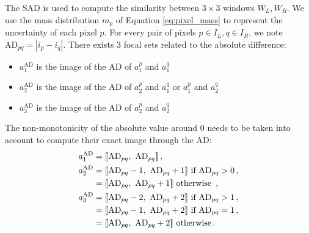 The SAD is used to compute the similarity between $3\times3$ windows $W_L, W_R$. We use the mass distribution $m_p$ of Equation \eqref{eq:pixel_mass} to represent the uncertainty of each pixel $p$. For every pair of pixels $p\in I_L, q\in I_R$, we note $\mathrm{AD}_{pq}=|i_p - i_q|$. There exists $3$ focal sets related to the absolute difference:
\begin{itemize}
    \item $a^{\mathrm{AD}}_1$ is the image of the AD of $a^p_1$ and $a^q_1$
    \item $a^{\mathrm{AD}}_2$ is the image of the AD of $a^p_2$ and $a^q_1$ or $a^p_1$ and $a^q_2$
    \item  $a^{\mathrm{AD}}_3$ is the image of the AD of $a^p_2$ and $a^q_2$
\end{itemize}
The non-monotonicity of the absolute value around $0$ needs to be taken into account to compute their exact image through the AD:
\begin{align*}
    a^{\mathrm{AD}}_1&=\opi\mathrm{AD}_{pq},~\mathrm{AD}_{pq}\cli\,,\\
    a^{\mathrm{AD}}_2&=\opi\mathrm{AD}_{pq} - 1,~\mathrm{AD}_{pq} + 1\cli\text{ if }\mathrm{AD}_{pq}>0\,,\\
            &=\opi\mathrm{AD}_{pq},~\mathrm{AD}_{pq} + 1\cli\text{ otherwise }\,,\\
    a^{\mathrm{AD}}_3&=\opi\mathrm{AD}_{pq} - 2,~\mathrm{AD}_{pq} + 2\cli\text{ if }\mathrm{AD}_{pq}>1\,,\\
            &=\opi\mathrm{AD}_{pq} - 1,~\mathrm{AD}_{pq} + 2\cli\text{ if }\mathrm{AD}_{pq}=1\,,\\
            &=\opi\mathrm{AD}_{pq},~\mathrm{AD}_{pq} + 2\cli\text{ otherwise}\,.
\end{align*}

